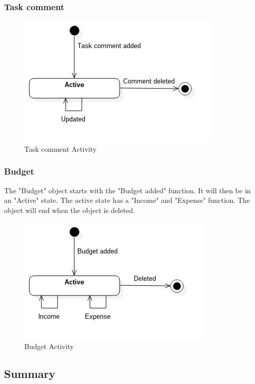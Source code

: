 \subsubsection*{Task comment}

\begin{figure}[H]
    \centering
    \includegraphics[scale=0.6]{Images/ProblemDomain/tcActivityDiagram.png}
    \caption{Task comment Activity}
    \label{fig:tcActivityDiagram}
\end{figure}

\subsubsection*{Budget}

The "Budget" object starts with the "Budget added" function. It will then be in an "Active" state. The active state has a "Income" and "Expense" function. The object will end when the object is deleted.

\begin{figure}[H]
    \centering
    \includegraphics[scale=0.6]{Images/ProblemDomain/budgetActivityDiagram.png}
    \caption{Budget Activity}
    \label{fig:budgetActivityDiagram}
\end{figure}

\subsection{Summary}

